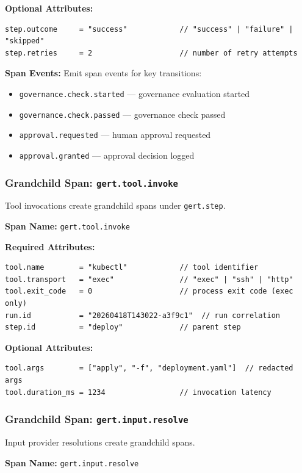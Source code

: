 \textbf{Optional Attributes:}
\begin{verbatim}
step.outcome     = "success"            // "success" | "failure" | "skipped"
step.retries     = 2                    // number of retry attempts
\end{verbatim}

\textbf{Span Events:} Emit span events for key transitions:
\begin{itemize}
  \item \texttt{governance.check.started} — governance evaluation started
  \item \texttt{governance.check.passed} — governance check passed
  \item \texttt{approval.requested} — human approval requested
  \item \texttt{approval.granted} — approval decision logged
\end{itemize}

\subsubsection{Grandchild Span: \texttt{gert.tool.invoke}}

Tool invocations create grandchild spans under \texttt{gert.step}.

\textbf{Span Name:} \texttt{gert.tool.invoke}

\textbf{Required Attributes:}
\begin{verbatim}
tool.name        = "kubectl"            // tool identifier
tool.transport   = "exec"               // "exec" | "ssh" | "http"
tool.exit_code   = 0                    // process exit code (exec only)
run.id           = "20260418T143022-a3f9c1"  // run correlation
step.id          = "deploy"             // parent step
\end{verbatim}

\textbf{Optional Attributes:}
\begin{verbatim}
tool.args        = ["apply", "-f", "deployment.yaml"]  // redacted args
tool.duration_ms = 1234                 // invocation latency
\end{verbatim}

\subsubsection{Grandchild Span: \texttt{gert.input.resolve}}

Input provider resolutions create grandchild spans.

\textbf{Span Name:} \texttt{gert.input.resolve}


